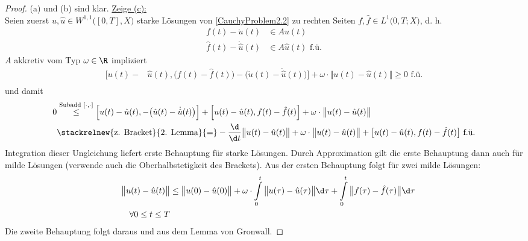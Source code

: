\begin{proof}
(a) und (b) sind klar.\nl
\underline{Zeige (c):}\\
Seien zuerst $u,\hat{u}\in W^{1,1}\big([0,T],X\big)$ starke Lösungen von \eqref{CauchyProblem2.2} zu rechten Seiten $f,\hat{f}\in L^1\big(0,T;X\big)$, d. h.
\begin{align*}
f(t)-\dot{u}(t)&\in A u(t)\\
\hat{f}(t)-\dot{\hat{u}}(t)&\in A\hat{u}(t)\text{ f.ü.}
\end{align*}
$A$ akkretiv vom Typ $\omega\in\R$ impliziert
\begin{align*}
\Big[u(t)-&\hat{u}(t),\big(f(t)-\hat{f}(t)\big)-\big(\dot{u}(t)-\dot{\hat{u}}(t)\big)\Big]+\omega\cdot\big\Vert u(t)-\hat{u}(t)\big\Vert\geq0\text{ f.ü.}\\
\end{align*}
und damit
\begin{align*}
0&\stackrel{\text{Subadd }[\cdot,\cdot]}{\leq}
\Big[u(t)-\hat{u}(t),-\big(\hat{u}(t)-\dot{\hat{u}}(t)\big)\Big]+
\Big[u(t)-\hat{u}(t),f(t)-\hat{f}(t)\Big]+
\omega\cdot\big\Vert u(t)-\hat{u}(t)\big\Vert\\
&\stackrelnew{\text{z. Bracket}}{\text{2. Lemma}}{=}
-\frac{\d}{\d t}\big\Vert u(t)-\hat{u}(t)\big\Vert+\omega\cdot\big\Vert u(t)-\hat{u}(t)\big\Vert+\big[u(t)-\hat{u}(t),f(t)-\hat{f}(t)\big]\text{ f.ü.}
\end{align*}
Integration dieser Ungleichung liefert erste Behauptung für starke Lösungen. Durch Approximation gilt die erste Behauptung dann auch für milde Lösungen (verwende auch die Oberhalbstetigkeit des Brackets). Aus der ersten Behauptung folgt für zwei milde Lösungen:
\begin{align*}
\big\Vert u(t)-\hat{u}(t)\big\Vert
&\leq\big\Vert u(0)-\hat{u}(0)\big\Vert+\omega\cdot\int\limits_0^t\big\Vert u(\tau)-\hat{u}(\tau)\big\Vert\d\tau+\int\limits_0^t\big\Vert f(\tau)-\hat{f}(\tau)\big\Vert\d\tau\\
\qquad\forall 0\leq t\leq T
\end{align*}
Die zweite Behauptung folgt daraus und aus dem Lemma von Gronwall.


\end{proof}

